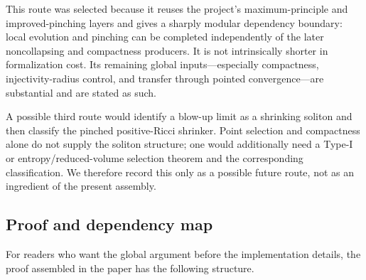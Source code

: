\documentclass[11pt]{article}
\theoremstyle{plain}
\theoremstyle{definition}
\theoremstyle{remark}
\begin{document}
This route was selected because it reuses the project's maximum-principle and
improved-pinching layers and gives a sharply modular dependency boundary:
local evolution and pinching can be completed independently of the later
noncollapsing and compactness producers.  It is not intrinsically shorter in
formalization cost.  Its remaining global inputs---especially compactness,
injectivity-radius control, and transfer through pointed convergence---are
substantial and are stated as such.

A possible third route would identify a blow-up limit as a shrinking soliton
and then classify the pinched positive-Ricci shrinker.  Point selection and
compactness alone do not supply the soliton structure; one would additionally
need a Type-I or entropy/reduced-volume selection theorem and the corresponding
classification.  We therefore record this only as a possible future route,
not as an ingredient of the present assembly.


\subsection{Proof and dependency map}
\label{subsec:proof-dependency-map}

For readers who want the global argument before the implementation details,
the proof assembled in the paper has the following structure.
\end{document}
